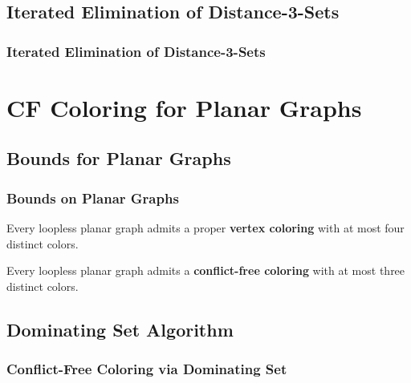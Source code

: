 \documentclass[xcolor=dvipsnames,aspectratio=1610]{beamer}
\begin{document}
  \subsection{Iterated Elimination of Distance-3-Sets}

  \begin{frame}
    \frametitle{Iterated Elimination of Distance-3-Sets}

    

  \end{frame}

  \section{CF Coloring for Planar Graphs}

  \subsection{Bounds for Planar Graphs}
  \begin{frame}
    \frametitle{Bounds on Planar Graphs}


    \begin{theorem}
    Every loopless planar graph admits a proper \textbf{vertex coloring} with at most {\color{red} four} distinct colors.
    \end{theorem}

    \pause

    \begin{theorem}
    Every loopless planar graph admits a \textbf{conflict-free coloring} with at most {\color{red} three} distinct colors.
    \end{theorem}

  \end{frame}

  \subsection{Dominating Set Algorithm}
  \begin{frame}
    \frametitle{Conflict-Free Coloring via Dominating Set}

    
  \end{frame}
\end{document}
